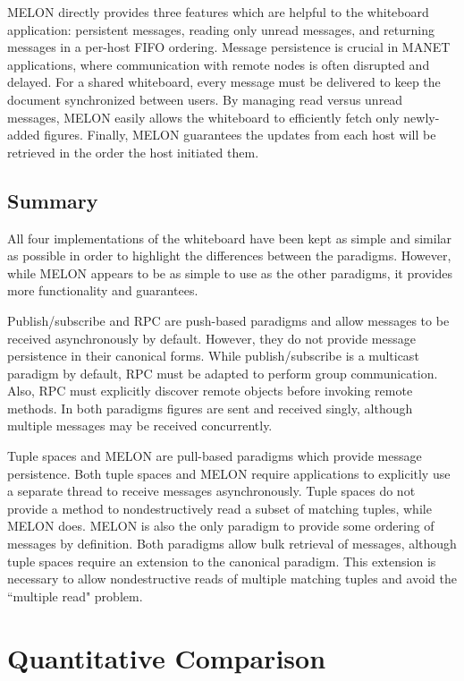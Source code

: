 \documentclass{llncs}
\begin{document}
MELON directly provides three features which are helpful to the whiteboard application: persistent messages, reading only unread messages, and returning messages in a per-host FIFO ordering. Message persistence is crucial in MANET applications, where communication with remote nodes is often disrupted and delayed. For a shared whiteboard, every message must be delivered to keep the document synchronized between users. By managing read versus unread messages, MELON easily allows the whiteboard to efficiently fetch only newly-added figures. Finally, MELON guarantees the updates from each host will be retrieved in the order the host initiated them.

\subsection{Summary}

All four implementations of the whiteboard have been kept as simple and similar as possible in order to highlight the differences between the paradigms. However, while MELON appears to be as simple to use as the other paradigms, it provides more functionality and guarantees.

Publish/subscribe and RPC are push-based paradigms and allow messages to be received asynchronously by default. However, they do not provide message persistence in their canonical forms. While publish/subscribe is a multicast paradigm by default, RPC must be adapted to perform group communication. Also, RPC must explicitly discover remote objects before invoking remote methods. In both paradigms figures are sent and received singly, although multiple messages may be received concurrently.

Tuple spaces and MELON are pull-based paradigms which provide message persistence. Both tuple spaces and MELON require applications to explicitly use a separate thread to receive messages asynchronously. Tuple spaces do not provide a method to nondestructively read a subset of matching tuples, while MELON does. MELON is also the only paradigm to provide some ordering of messages by definition. Both paradigms allow bulk retrieval of messages, although tuple spaces require an extension to the canonical paradigm. This extension is necessary to allow nondestructive reads of multiple matching tuples and avoid the ``multiple read" problem.

\section{Quantitative Comparison}\label{sec:comparison}
\end{document}
